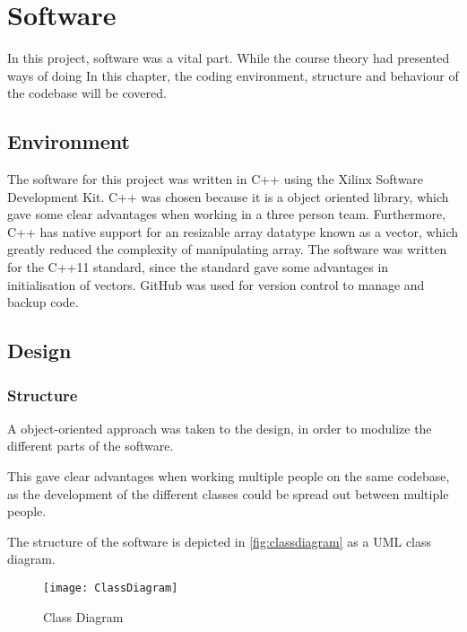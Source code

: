 \documentclass[Main]{subfiles}
\begin{document}
\section{Software} %
\label{sec:software}

	In this project, software was a vital part. 
	While the course theory had presented ways of doing 
	In this chapter, the coding environment, structure and behaviour of the codebase will be covered.
	
	\subsection{Environment} %
	\label{sub:software_environment}

		The software for this project was written in C++ using the Xilinx Software Development Kit.
		C++ was chosen because it is a object oriented library, which gave some clear advantages when working in a three person team.
		Furthermore, C++ has native support for an resizable array datatype known as a vector, which greatly reduced the complexity of manipulating array.
		The software was written for the C++11 standard, since the standard gave some advantages in initialisation of vectors.
		GitHub was used for version control	to manage and backup code.
		
		
	\subsection{Design} %
	\label{sub:software_design}
	
	\subsubsection{Structure} %
	\label{subsub:software_structure}
		A object-oriented approach was taken to the design, in order to modulize the different parts of the software. 
		
		This gave clear advantages when working multiple people on the same codebase, as the development of the different classes could be spread out between multiple people.
		
		The structure of the software is depicted in \autoref{fig:classdiagram} as a UML class diagram.
		
		\begin{figure}[H]
			\centering
			\texttt{[image: ClassDiagram]}
			\caption{Class Diagram}
			\label{fig:classdiagram}
		\end{figure}
\end{document}
